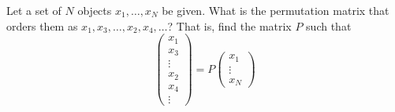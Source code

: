 Let a set of $N$ objects $x_1,\ldots,x_N$ be given. What is the
permutation matrix that orders them as $x_1,x_3,\ldots,x_2,x_4,\ldots$?
That is, find the matrix $P$ such that
\[
\begin{pmatrix}
x_1\\x_3\\\vdots\\x_2\\x_4\\\vdots
\end{pmatrix} = P
\begin{pmatrix}
x_1\\\vdots\\x_N
\end{pmatrix}
\]
